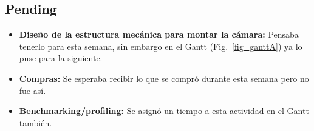 \subsection{Pending}

\begin{itemize}
	\item \textbf{Diseño de la estructura mecánica para montar la cámara:} Pensaba tenerlo para esta semana, sin embargo en el Gantt (Fig.~\ref{fig_ganttA}) ya lo puse para la siguiente.
	\item \textbf{Compras:} Se esperaba recibir lo que se compró durante esta semana pero no fue así.
	\item \textbf{Benchmarking/profiling:} Se asignó un tiempo a esta actividad en el Gantt también.
\end{itemize}
